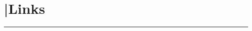 \section{\textcolor{gold}{\faChain}|Links} 
\noindent\color{blue}\rule{5.5cm}{0.4pt}

 \href{https://github.com/mkeller36}{\textcolor{gold}{\faGitSquare}\space {}} \\
 \href{https://www.linkedin.com/in/mjkeller97/}{} 
